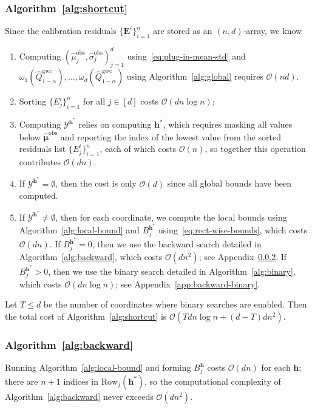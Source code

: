 \subsubsection{Algorithm~\ref{alg:shortcut}}
\label{app:lwc-sc-cost}
Since the calibration residuals $\{\mathbf{E}^i\}_{i=1}^{n}$ are stored as an $(n,d)$-array, we know
\begin{enumerate}
    \item Computing $(\hat\mu^{\mathrm{obs}}_j,\hat\sigma^{\mathrm{obs}}_j)_{j=1}^d$ using~\eqref{eq:plug-in-mean-std} and $\omega_1(\hat{Q}^{\mathrm{gwc}}_{1-\alpha}),\ldots,\omega_d(\hat{Q}^{\mathrm{gwc}}_{1-\alpha})$ using Algorithm~\ref{alg:global} requires $\mathcal O(nd)$.
    \item Sorting $\{E^i_j\}^n_{i=1}$ for all $j\in [d]$ costs $\mathcal{O}(dn\log{n})$;
    \item Computing $\mathcal{Y}^{\mathbf{h}^*}$ relies on computing $\mathbf{h}^*$, which requires masking all values below $\hat{\boldsymbol\mu}^{\mathrm{obs}}$ and reporting the index of the lowest value from the sorted residuals list $\{E^i_j\}^n_{i=1}$, each of which costs $\mathcal{O}(n)$, so together this operation contributes $\mathcal{O}(dn)$.
    \item If $\mathcal{Y}^{\mathbf{h}^*} = \emptyset$, then the cost is only $\mathcal{O}(d)$ since all global bounds have been computed.
    \item If $\mathcal{Y}^{\mathbf{h}^*} \neq \emptyset$, then for each coordinate, we compute the local bounds using Algorithm~\ref{alg:local-bound} and $B^{\mathbf{h}^*}_j$ using~\eqref{eq:rect-wise-bounds}, which costs $\mathcal{O}(dn)$.
    If $B^{\mathbf{h}^*}_j = 0$, then we use the backward search detailed in Algorithm~\ref{alg:backward}, which costs $\mathcal{O}(dn^2)$; see Appendix~\ref{app:backward-backward}.
    If $B^{\mathbf{h}^*}_j > 0$, then we use the binary search detailed in Algorithm~\ref{alg:binary}, which costs $\mathcal{O}(dn\log{n})$; see Appendix~\ref{app:backward-binary}.
\end{enumerate}  
Let $T \leq d$ be the number of coordinates where binary searches are enabled. Then the total cost of Algorithm~\ref{alg:shortcut} is $\mathcal{O}(Tdn\log{n} + (d-T)dn^2)$.

\subsubsection{Algorithm~\ref{alg:backward}} \label{app:backward-backward}
Running Algorithm~\ref{alg:local-bound} and forming $B^{\mathbf{h}}_j$ costs $\mathcal{O}(dn)$ for each $\mathbf{h}$; there are $n+1$ indices in
$\mathrm{Row}_j(\mathbf{h}^*)$, so the computational complexity of Algorithm~\ref{alg:backward} never exceeds $\mathcal{O}(dn^2)$.

